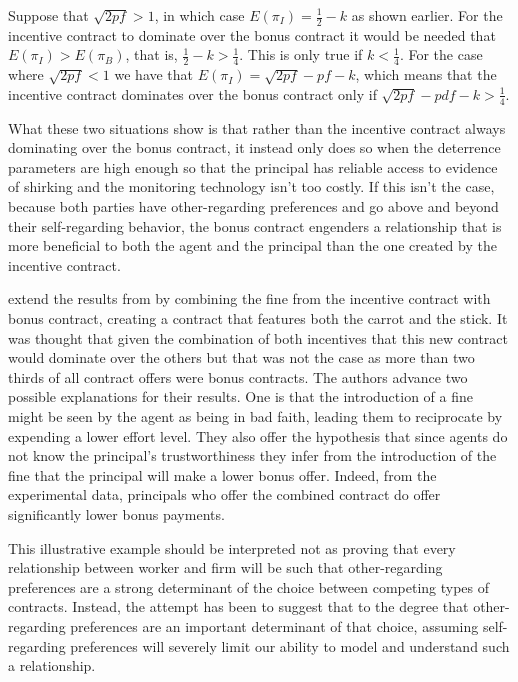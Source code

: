 \documentclass[12pt]{article}
\begin{document}
Suppose that $\sqrt{2pf} > 1$, in which case $E\left(\pi_I\right) = \frac{1}{2} - k$ as shown earlier. For the incentive contract to dominate over the bonus contract it would be needed that $E\left(\pi_I\right) > E\left(\pi_B\right)$, that is, $\frac{1}{2} - k > \frac{1}{4}$. This is only true if $ k < \frac{1}{4}$. For the case where $\sqrt{2pf}<1$ we have that $E\left(\pi_I\right) = \sqrt{2pf} - pf - k$, which means that the incentive contract dominates over the bonus contract only if $\sqrt{2pf} - pdf - k >\frac{1}{4}$.

What these two situations show is that rather than the incentive contract always dominating over the bonus contract, it instead only does so when the deterrence parameters are high enough so that the principal has reliable access to evidence of shirking and the monitoring technology isn't too costly. If this isn't the case, because both parties have other-regarding preferences and go above and beyond their self-regarding behavior, the bonus contract engenders a relationship that is more beneficial to both the agent and the principal than the one created by the incentive contract.

\cite{fehr2007adding} extend the results from \cite{fehr2007fairness} by combining the fine from the incentive contract with bonus contract, creating a contract that features both the carrot and the stick. It was thought that given the combination of both incentives that this new contract would dominate over the others but that was not the case as more than two thirds of all contract offers were bonus contracts. The authors advance two possible explanations for their results. One is that the introduction of a fine might be seen by the agent as being in bad faith, leading them to reciprocate by expending a lower effort level. They also offer the hypothesis that since agents do not know the principal's trustworthiness they infer from the introduction of the fine that the principal will make a lower bonus offer. Indeed, from the experimental data, principals who offer the combined contract do offer significantly lower bonus payments.

This illustrative example should be interpreted not as proving that every relationship between worker and firm will be such that other-regarding preferences are a strong determinant of the choice between competing types of contracts. Instead, the attempt has been to suggest that to the degree that other-regarding preferences are an important determinant of that choice, assuming self-regarding preferences will severely limit our ability to model and understand such a relationship.
\end{document}
